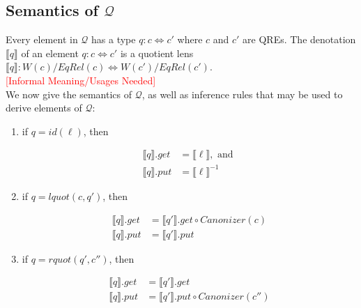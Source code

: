 \documentclass{svproc}
\begin{document}
\subsection{Semantics of $\mathcal{Q}$}
Every element in $\mathcal{Q}$ has a type $q :
c \Longleftrightarrow c'$ where $c$ and $c'$ are QREs. The denotation
$\llbracket q \rrbracket$ of an element $q : c \Longleftrightarrow c'$ is a
quotient lens $\llbracket q \rrbracket :
W(c)/{EqRel(c)} \Longleftrightarrow W(c')/{EqRel(c')}$.\\
\textcolor{red}{[Informal Meaning/Usages Needed]}\\We now give the
semantics of $\mathcal{Q}$, as well as inference rules that may be used to
derive elements of $\mathcal{Q}$:
\begin{enumerate}
  \item
  if $q = id(\ell)$, then
  \begin{prooftree}
\end{prooftree}
  \begin{align*}
  \llbracket q \rrbracket.get &=  \llbracket \ell \rrbracket, \text{ and }\\
  \llbracket q \rrbracket.put &= \llbracket \ell \rrbracket^{-1}
  \end{align*}
 
  \item if $q = lquot(c, q')$, then
\begin{prooftree}
\end{prooftree}
  \begin{align*}
  \llbracket q \rrbracket.get  &= \llbracket q'
  \rrbracket.get \circ Canonizer(c)\\
  \llbracket q \rrbracket.put &= \llbracket q' \rrbracket.put
  \end{align*}
  \item
  if $q = rquot(q', c'')$, then
  \begin{prooftree}
  
\end{prooftree}
  \begin{align*}
  \llbracket q \rrbracket.get &= \llbracket q'
  \rrbracket.get\\
  \llbracket q \rrbracket.put &= \llbracket q'
  \rrbracket.put \circ Canonizer(c'')
  \end{align*}
  

\end{enumerate}
\end{document}
